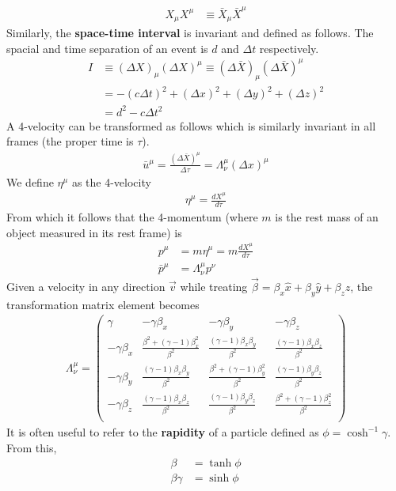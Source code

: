 \begin{multicols}{2}
\begin{align}
	X_\mu X^\mu &\equiv \bar{X}_\mu\bar{X}^\mu 
\end{align}
Similarly, the \textbf{space-time interval} is invariant and defined as follows. The spacial and time separation of an event is $d$ and $\Delta t$ respectively. 
\begin{align}
	I &\equiv (\Delta X)_\mu (\Delta X)^\mu \equiv (\Delta \bar{X})_\mu(\Delta \bar{X})^\mu \\
	&= -(c\Delta t)^2+(\Delta x)^2+(\Delta y)^2+(\Delta z)^2 \\
	& = d^2-c \Delta t^2
\end{align}
A 4-velocity can be transformed as follows which is similarly invariant in all frames (the proper time is $\tau$). 
\begin{align}
	\bar{u}^\mu=\frac{(\Delta \bar{X})^\mu}{\Delta \tau} = \Lambda_\nu^\mu(\Delta x)^\mu
\end{align}
We define $\eta^\mu$ as the 4-velocity
\begin{align}
	\eta^\mu = \frac{dX^\mu}{d\tau}
\end{align} 
From which it follows that the 4-momentum (where $m$ is the rest mass of an object measured in its rest frame) is
\begin{align}
	p^\mu &= m\eta^\mu = m\frac{dX^\mu}{d\tau} \\
	\bar{p}^\mu &= \Lambda_\nu^\mu p^\nu
\end{align}
Given a velocity in any direction $\vec{v}$ while treating $\vec{\beta} = \beta_x \hat{x}+\beta_y \hat{y}+\beta_z \hat{z}$, the transformation matrix element becomes
\begin{align}
	\Lambda_\nu^\mu = 
	\begin{pmatrix}
		\gamma & -\gamma \beta_x & -\gamma \beta_y & -\gamma \beta_z \\
		-\gamma \beta_x & \frac{\beta^2+(\gamma-1)\beta_x^2}{\beta^2} & \frac{(\gamma-1)\beta_x\beta_y}{\beta^2} & \frac{(\gamma-1)\beta_x\beta_z}{\beta^2}\\
		-\gamma \beta_y & \frac{(\gamma-1)\beta_x\beta_y}{\beta^2} &  \frac{\beta^2+(\gamma-1)\beta_y^2}{\beta^2} & \frac{(\gamma-1)\beta_y\beta_z}{\beta^2}  \\
		-\gamma \beta_z & \frac{(\gamma-1)\beta_x\beta_z}{\beta^2} & \frac{(\gamma-1)\beta_y\beta_z}{\beta^2} &  \frac{\beta^2+(\gamma-1)\beta_z^2}{\beta^2}  \\
	\end{pmatrix}
\end{align}
It is often useful to refer to the \textbf{rapidity} of a particle defined as $\phi = \cosh^{-1}\gamma$. From this,
\begin{align}
\beta &= \tanh \phi \\
\beta \gamma &= \sinh \phi
\end{align} 

\end{multicols}
